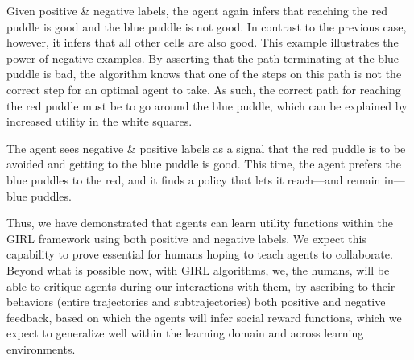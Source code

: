 Given positive \& negative labels, the agent again infers that
reaching the red puddle is good and the blue puddle is not
good. In contrast to the previous case, however, it infers that all
other cells are also good. This example illustrates the power of
negative examples. By asserting that the path terminating at the blue
puddle is bad, the algorithm knows that one of the steps on this path
is not the correct step for an optimal agent to take. As such, the
correct path for reaching the red puddle must be to go around the blue
puddle, which can be explained by increased utility in the white
squares.

The agent sees negative \& positive labels as a signal that the red
puddle is to be avoided and getting to the blue puddle is good.  This
time, the agent prefers the blue puddles to the red, and it finds a
policy that lets it reach---and remain in---blue puddles.


Thus, we have demonstrated that agents can learn utility functions
within the GIRL framework using both positive and negative labels.  We
expect this capability to prove essential for humans hoping to teach
agents to collaborate.  Beyond what is possible now, with GIRL
algorithms, we, the humans, will be able to critique agents during our
interactions with them, by ascribing to their behaviors (entire
trajectories and subtrajectories) both positive and negative feedback,
based on which the agents will infer social reward functions, which we
expect to generalize well within the learning domain and across
learning environments.

